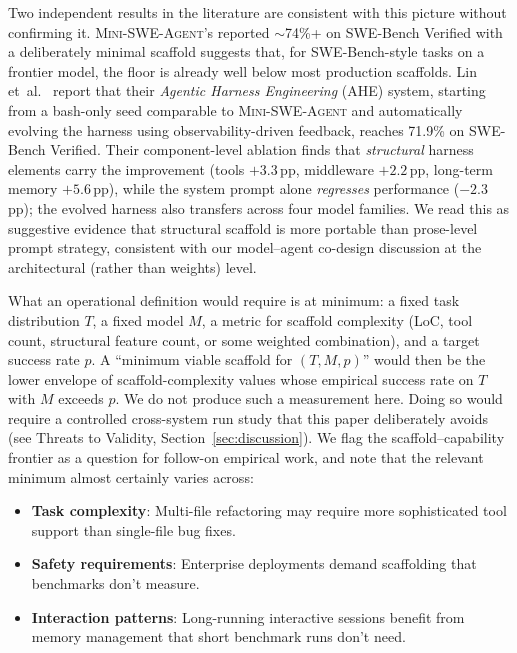 \documentclass[11pt,a4paper]{article}
\newcommand{\mswe}{\textsc{Mini-SWE-Agent}\xspace}
\begin{document}
Two independent results in the literature are consistent with this picture without confirming it.
\mswe{}'s reported $\sim$74\%+ on SWE-Bench Verified with a deliberately minimal scaffold suggests that, for SWE-Bench-style tasks on a frontier model, the floor is already well below most production scaffolds.
Lin et~al.~\cite{lin2026ahe} report that their \emph{Agentic Harness Engineering} (AHE) system, starting from a bash-only seed comparable to \mswe{} and automatically evolving the harness using observability-driven feedback, reaches 71.9\% on SWE-Bench Verified.
Their component-level ablation finds that \emph{structural} harness elements carry the improvement (tools $+3.3$\,pp, middleware $+2.2$\,pp, long-term memory $+5.6$\,pp), while the system prompt alone \emph{regresses} performance ($-2.3$\,pp); the evolved harness also transfers across four model families.
We read this as suggestive evidence that structural scaffold is more portable than prose-level prompt strategy, consistent with our model--agent co-design discussion at the architectural (rather than weights) level.

What an operational definition would require is at minimum: a fixed task distribution $T$, a fixed model $M$, a metric for scaffold complexity (LoC, tool count, structural feature count, or some weighted combination), and a target success rate $p$.
A ``minimum viable scaffold for $(T, M, p)$'' would then be the lower envelope of scaffold-complexity values whose empirical success rate on $T$ with $M$ exceeds $p$.
We do not produce such a measurement here.
Doing so would require a controlled cross-system run study that this paper deliberately avoids (see Threats to Validity, Section~\ref{sec:discussion}).
We flag the scaffold--capability frontier as a question for follow-on empirical work, and note that the relevant minimum almost certainly varies across:

\begin{itemize}[itemsep=1pt]
  \item \textbf{Task complexity}: Multi-file refactoring may require more sophisticated tool support than single-file bug fixes.
  \item \textbf{Safety requirements}: Enterprise deployments demand scaffolding that benchmarks don't measure.
  \item \textbf{Interaction patterns}: Long-running interactive sessions benefit from memory management that short benchmark runs don't need.
\end{itemize}
\end{document}
